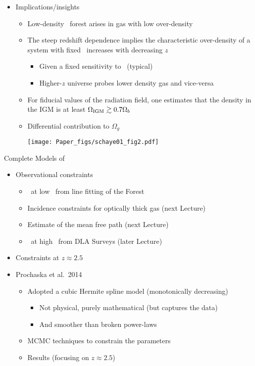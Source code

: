 \documentclass[12pt,letterpaper]{article}
\begin{document}
\begin{Aenumerate}
\begin{itemize}
	\item Implications/insights
		\begin{itemize}
		\item Low-density \lya\ forest arises in gas with low over-density 
		\item The steep redshift dependence implies the characteristic
		over-density of a system with fixed \nhi\ increases with decreasing $z$
			\begin{itemize}
			\item Given a fixed sensitivity to \nhi\ (typical)
			\item Higher-$z$ universe probes lower density gas and vice-versa
			\end{itemize}
		\item For fiducial values of the radiation field, one estimates
		that the density in the IGM is at least 
		$\Omega_{\rm IGM} \gtrsim 0.7 \Omega_b$
		\item Differential contribution to $\Omega_g$

	\texttt{[image: Paper\_figs/schaye01\_fig2.pdf]}

		\end{itemize}

	\end{itemize}

{\bf \item Complete Models of }
	\begin{itemize}
	\item Observational constraints
		\begin{itemize}
		\item \fnhi\ at low \nhi\ from line fitting of the Forest
		\item Incidence constraints for optically thick gas (next Lecture)
		\item Estimate of the mean free path (next Lecture)
		\item \fnhi\ at high \nhi\ from DLA Surveys (later Lecture)
		\end{itemize}
	\item Constraints at $z \approx 2.5$
	\item Prochaska et al.\ 2014
		\begin{itemize}
		\item Adopted a cubic Hermite spline model (monotonically decreasing)
			\begin{itemize}
			\item Not physical, purely mathematical (but captures the data)
			\item And smoother than broken power-laws
			\end{itemize}
		\item MCMC techniques to constrain the parameters
		\item Results (focusing on $z \approx 2.5$)


\end{itemize}
\end{itemize}
\end{Aenumerate}
\end{document}
